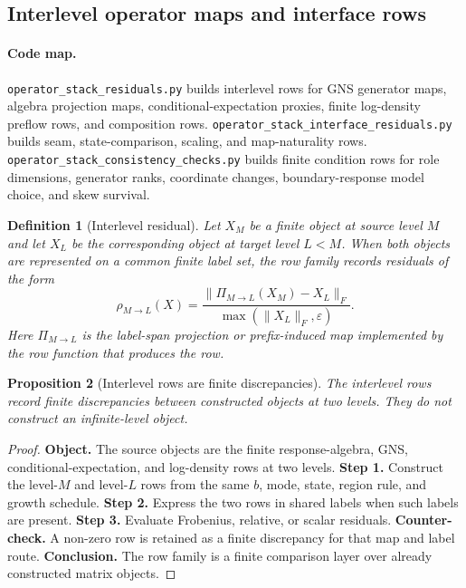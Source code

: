 \documentclass[11pt]{article}
\newtheorem{definition}{Definition}[section]
\newtheorem{proposition}[definition]{Proposition}
\theoremstyle{remark}
\newcommand{\code}[1]{\texttt{#1}}
\newcommand{\eps}{\varepsilon}
\numberwithin{equation}{section}
\begin{document}
\subsection{Interlevel operator maps and interface rows}
\paragraph{Code map.} \code{operator\_\allowbreak{}stack\_\allowbreak{}residuals.py} builds interlevel rows for GNS generator maps, algebra projection maps, conditional-expectation proxies, finite log-density preflow rows, and composition rows. \code{operator\_\allowbreak{}stack\_\allowbreak{}interface\_\allowbreak{}residuals.py} builds seam, state-comparison, scaling, and map-naturality rows. \code{operator\_\allowbreak{}stack\_\allowbreak{}consistency\_\allowbreak{}checks.py} builds finite condition rows for role dimensions, generator ranks, coordinate changes, boundary-response model choice, and skew survival.

\begin{definition}[Interlevel residual]
Let $X_M$ be a finite object at source level $M$ and let $X_L$ be the corresponding object at target level $L<M$. When both objects are represented on a common finite label set, the row family records residuals of the form
\begin{equation}
  \rho_{M\to L}(X)=\frac{\|\Pi_{M\to L}(X_M)-X_L\|_F}{\max(\|X_L\|_F,\eps)}.
  \label{eq:interlevel-residual}
\end{equation}
Here $\Pi_{M\to L}$ is the label-span projection or prefix-induced map implemented by the row function that produces the row.
\end{definition}

\begin{proposition}[Interlevel rows are finite discrepancies]
The interlevel rows record finite discrepancies between constructed objects at two levels. They do not construct an infinite-level object.
\end{proposition}
\begin{proof}
\textbf{Object.} The source objects are the finite response-algebra, GNS, conditional-expectation, and log-density rows at two levels. \textbf{Step 1.} Construct the level-$M$ and level-$L$ rows from the same $b$, mode, state, region rule, and growth schedule. \textbf{Step 2.} Express the two rows in shared labels when such labels are present. \textbf{Step 3.} Evaluate Frobenius, relative, or scalar residuals. \textbf{Counter-check.} A non-zero row is retained as a finite discrepancy for that map and label route. \textbf{Conclusion.} The row family is a finite comparison layer over already constructed matrix objects.
\end{proof}
\end{document}
